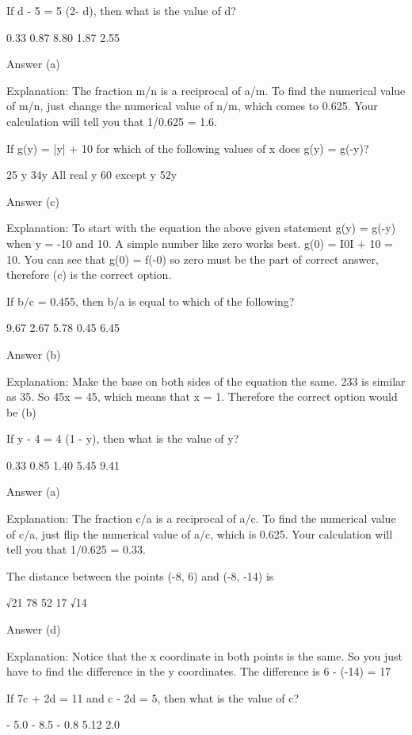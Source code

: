     If d - 5 = 5 (2- d), then what is the value of d?

        0.33
        0.87
        8.80
        1.87
        2.55 

    Answer (a)

    Explanation: The fraction m/n is a reciprocal of a/m. To find the numerical value of m/n, just change the numerical value of n/m, which comes to 0.625. Your calculation will tell you that 1/0.625 = 1.6. 



If g(y) = |y| + 10 for which of the following values of x does g(y) = g(-y)?

    25 y
    34y
    All real y
    60 except y
    52y 

Answer (c)

Explanation: To start with the equation the above given statement g(y) = g(-y) when y = -10 and 10. A simple number like zero works best. g(0) = Ι0Ι + 10 = 10. You can see that g(0) = f(-0) so zero must be the part of correct answer, therefore (c) is the correct option.

If b/c = 0.455, then b/a is equal to which of the following?

    9.67
    2.67
    5.78
    0.45
    6.45 

Answer (b)

Explanation: Make the base on both sides of the equation the same. 233 is similar as 35. So 45x  = 45, which means that x = 1. Therefore the correct option would be (b)

If y - 4 = 4 (1 - y), then what is the value of y?

    0.33
    0.85
    1.40
    5.45
    9.41 

Answer (a)

Explanation: The fraction c/a is a reciprocal of a/c. To find the numerical value of c/a, just flip the numerical value of a/c, which is 0.625. Your calculation will tell you that 1/0.625 = 0.33.

The distance between the points (-8, 6) and (-8, -14) is

    √21
    78
    52
    17
    √14 

Answer (d)

Explanation: Notice that the x coordinate in both points is the same. So you just have to find the difference in the y coordinates. The difference is 6 - (-14) = 17

If 7c + 2d = 11 and c - 2d = 5, then what is the value of c?

    - 5.0
    - 8.5
    - 0.8
    5.12
    2.0 

